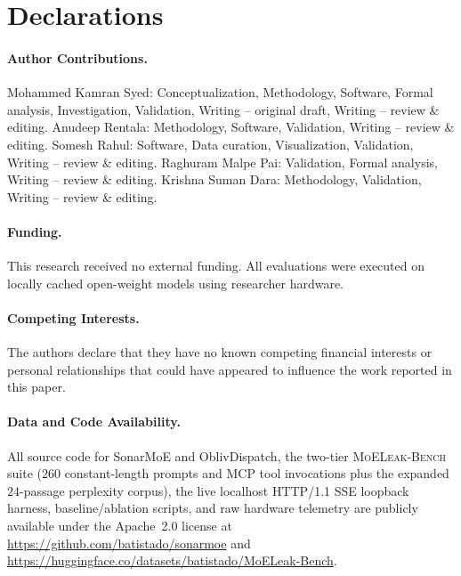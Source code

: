 \documentclass[11pt,a4paper]{article}
\renewcommand{\_}{\textunderscore\allowbreak}
\def\SM{SonarMoE}%
\def\OD{OblivDispatch}%
\theoremstyle{definition}
\theoremstyle{remark}
\newcommand{\SM}{\textsc{SonarMoE}}
\newcommand{\OD}{\textsc{OblivDispatch}}
\newcommand{\MLB}{\textsc{MoELeak-Bench}}
\begin{document}
\section*{Declarations}

\paragraph{Author Contributions.}
Mohammed Kamran Syed: Conceptualization, Methodology, Software, Formal analysis, Investigation, Validation, Writing -- original draft, Writing -- review \& editing.
Anudeep Rentala: Methodology, Software, Validation, Writing -- review \& editing.
Somesh Rahul: Software, Data curation, Visualization, Validation, Writing -- review \& editing.
Raghuram Malpe Pai: Validation, Formal analysis, Writing -- review \& editing.
Krishna Suman Dara: Methodology, Validation, Writing -- review \& editing.

\paragraph{Funding.}
This research received no external funding. All evaluations were executed on locally cached open-weight models using researcher hardware.

\paragraph{Competing Interests.}
The authors declare that they have no known competing financial interests or personal relationships that could have appeared to influence the work reported in this paper.

\paragraph{Data and Code Availability.}
All source code for \SM{} and \OD{}, the two-tier \MLB{} suite ($260$ constant-length prompts and MCP tool invocations plus the expanded $24$-passage perplexity corpus), the live localhost HTTP/1.1 SSE loopback harness, baseline/ablation scripts, and raw hardware telemetry are publicly available under the Apache~2.0 license at \url{https://github.com/batistado/sonarmoe} and \url{https://huggingface.co/datasets/batistado/MoELeak-Bench}.



\end{document}
